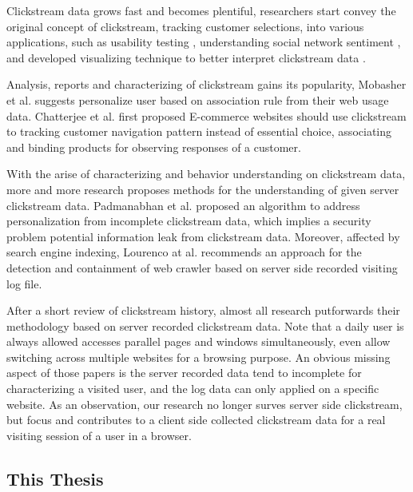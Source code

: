 Clickstream data grows fast and becomes plentiful, researchers start convey the original concept of clickstream,
tracking customer selections, into various applications, such as usability testing \cite{Waterson:2002:LOW:506443.506602},
understanding social network sentiment \cite{Schneider:2009:UOS:1644893.1644899}, and developed visualizing
technique to better interpret clickstream data \cite{Waterson:2002:DTU:1556262.1556276}.

Analysis, reports and characterizing of clickstream gains its popularity, Mobasher et al. \cite{Mobasher:2001:EPB:502932.502935}
suggests personalize user based on association rule from their web usage data. Chatterjee et al. \cite{chatterjee2003modeling} 
first proposed E-commerce websites should use clickstream to tracking customer navigation pattern instead of essential choice, 
associating and binding products for observing responses of a customer.

With the arise of characterizing and behavior understanding on clickstream data, more 
and more research proposes methods for the understanding of given server clickstream data.
Padmanabhan et al. \cite{Padmanabhan:2001:PID:502512.502535}
proposed an algorithm to address personalization from incomplete clickstream data, which implies
a security problem potential information leak from clickstream data. 
Moreover, affected by search engine indexing, Lourenco at al. \cite{Lourenco:2006:CWC:1145581.1145634} recommends an approach for
the detection and containment of web crawler based on server side recorded visiting log file.

After a short review of clickstream history, almost all research putforwards their 
methodology based on server recorded clickstream data.
Note that a daily user is always allowed accesses parallel pages and windows simultaneously,
even allow switching across multiple websites for a browsing purpose.
An obvious missing aspect of those papers is the server recorded data tend to incomplete for 
characterizing a visited user, and the log data can only applied on a specific website. 
As an observation, our research no longer surves server side clickstream, 
but focus and contributes to a client side collected clickstream data 
for a real visiting session of a user in a browser.

\subsection{This Thesis}


